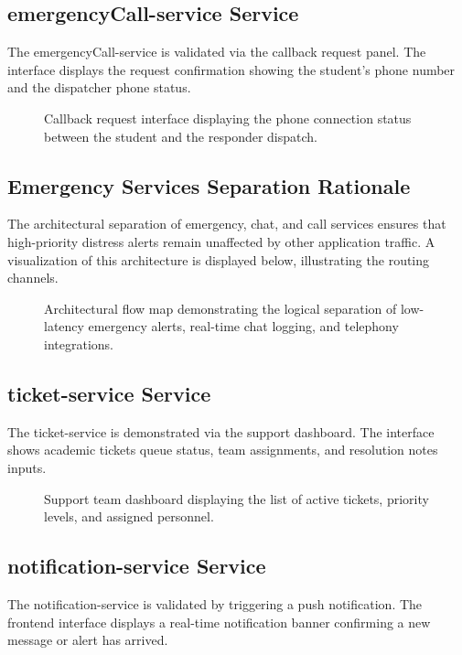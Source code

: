 \documentclass[12pt]{article}
\begin{document}
\subsection{emergencyCall-service Service}
The emergencyCall-service is validated via the callback request panel. The interface displays the request confirmation showing the student's phone number and the dispatcher phone status.

\begin{figure}[htbp]
    \centering
    \caption{Callback request interface displaying the phone connection status between the student and the responder dispatch.}
    \label{fig:call_request}
\end{figure}

\subsection{Emergency Services Separation Rationale}
The architectural separation of emergency, chat, and call services ensures that high-priority distress alerts remain unaffected by other application traffic. A visualization of this architecture is displayed below, illustrating the routing channels.

\begin{figure}[htbp]
    \centering
    \caption{Architectural flow map demonstrating the logical separation of low-latency emergency alerts, real-time chat logging, and telephony integrations.}
    \label{fig:emergency_architecture}
\end{figure}

\subsection{ticket-service Service}
The ticket-service is demonstrated via the support dashboard. The interface shows academic tickets queue status, team assignments, and resolution notes inputs.

\begin{figure}[htbp]
    \centering
    \caption{Support team dashboard displaying the list of active tickets, priority levels, and assigned personnel.}
    \label{fig:tickets_dashboard}
\end{figure}

\subsection{notification-service Service}
The notification-service is validated by triggering a push notification. The frontend interface displays a real-time notification banner confirming a new message or alert has arrived.
\end{document}
